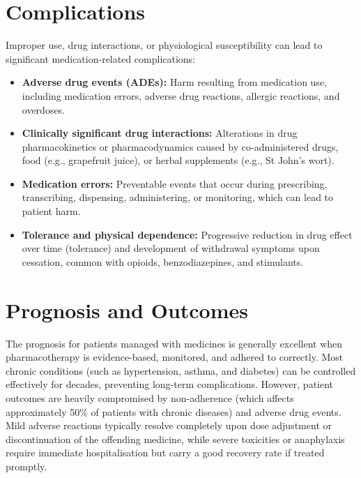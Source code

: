 \section*{Complications}
Improper use, drug interactions, or physiological susceptibility can lead to significant medication-related complications:
\begin{itemize}
    \item \textbf{Adverse drug events (ADEs):} Harm resulting from medication use, including medication errors, adverse drug reactions, allergic reactions, and overdoses.
    \item \textbf{Clinically significant drug interactions:} Alterations in drug pharmacokinetics or pharmacodynamics caused by co-administered drugs, food (e.g., grapefruit juice), or herbal supplements (e.g., St John's wort).
    \item \textbf{Medication errors:} Preventable events that occur during prescribing, transcribing, dispensing, administering, or monitoring, which can lead to patient harm.
    \item \textbf{Tolerance and physical dependence:} Progressive reduction in drug effect over time (tolerance) and development of withdrawal symptoms upon cessation, common with opioids, benzodiazepines, and stimulants.
\end{itemize}

\section*{Prognosis and Outcomes}
The prognosis for patients managed with medicines is generally excellent when pharmacotherapy is evidence-based, monitored, and adhered to correctly. Most chronic conditions (such as hypertension, asthma, and diabetes) can be controlled effectively for decades, preventing long-term complications. However, patient outcomes are heavily compromised by non-adherence (which affects approximately 50\% of patients with chronic diseases) and adverse drug events. Mild adverse reactions typically resolve completely upon dose adjustment or discontinuation of the offending medicine, while severe toxicities or anaphylaxis require immediate hospitalisation but carry a good recovery rate if treated promptly.

